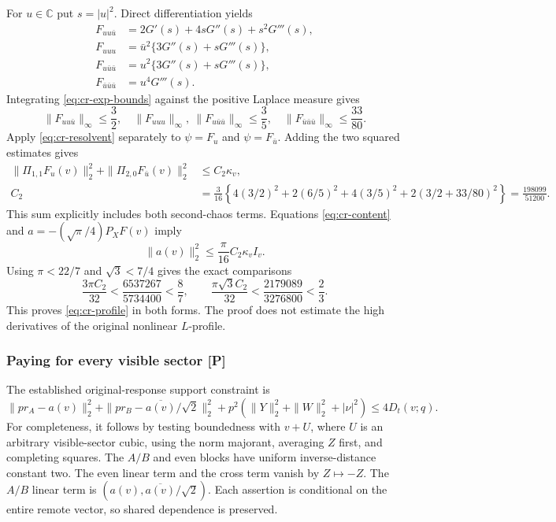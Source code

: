 For $u\in\mathbb C$ put $s=|u|^2$. Direct differentiation yields
\begin{align*}
 F_{uu\bar u}&=2G'(s)+4sG''(s)+s^2G'''(s),\\
 F_{uuu}&=\bar u^2\{3G''(s)+sG'''(s)\},\\
 F_{u\bar u\bar u}&=u^2\{3G''(s)+sG'''(s)\},\\
 F_{\bar u\bar u\bar u}&=u^4G'''(s).
\end{align*}
Integrating \eqref{eq:cr-exp-bounds} against the positive Laplace
measure gives
\[
 \|F_{uu\bar u}\|_\infty\le\frac32,
 \quad\|F_{uuu}\|_\infty,\ \|F_{u\bar u\bar u}\|_\infty\le\frac35,
 \quad\|F_{\bar u\bar u\bar u}\|_\infty\le\frac{33}{80}.
\]
Apply \eqref{eq:cr-resolvent} separately to $\psi=F_u$ and
$\psi=F_{\bar u}$. Adding the two squared estimates gives
\begin{align*}
 \|\Pi_{1,1}F_u(v)\|_2^2+\|\Pi_{2,0}F_{\bar u}(v)\|_2^2
 &\le C_2\kappa_v,\\
 C_2&=\frac3{16}\left\{4(3/2)^2+2(6/5)^2
                 +4(3/5)^2+2(3/2+33/80)^2\right\}
       =\frac{198099}{51200}.
\end{align*}
This sum explicitly includes both second-chaos terms.
Equations \eqref{eq:cr-content} and $a=-(\sqrt\pi/4)P_XF(v)$ imply
\[
 \|a(v)\|_2^2\le\frac\pi{16}C_2\kappa_v I_v.
\]
Using $\pi<22/7$ and $\sqrt3<7/4$ gives the exact comparisons
\[
 \frac{3\pi C_2}{32}<\frac{6537267}{5734400}<\frac87,
 \qquad
 \frac{\pi\sqrt3 C_2}{32}
       <\frac{2179089}{3276800}<\frac23.
\]
This proves \eqref{eq:cr-profile} in both forms. The proof does not
estimate the high derivatives of the original nonlinear $L$-profile.

\subsubsection{Paying for every visible sector [P]}

The established original-response support constraint is
\begin{equation}\label{eq:cr-support-vector}
 \|pr_A-a(v)\|_2^2+
 \|pr_B-\overline{a(v)}/\sqrt2\|_2^2
       +p^2(\|Y\|_2^2+\|W\|_2^2+|\nu|^2)
 \le4D_t(v;q).
\end{equation}
For completeness, it follows by testing boundedness with $v+U$, where
$U$ is an arbitrary visible-sector cubic, using the norm majorant,
averaging $Z$ first, and completing squares. The $A/B$ and even blocks
have uniform inverse-distance constant two. The even linear term and
the cross term vanish by $Z\mapsto-Z$. The $A/B$ linear term is
$(a(v),\overline{a(v)}/\sqrt2)$. Each assertion is conditional on the
entire remote vector, so shared dependence is preserved.


